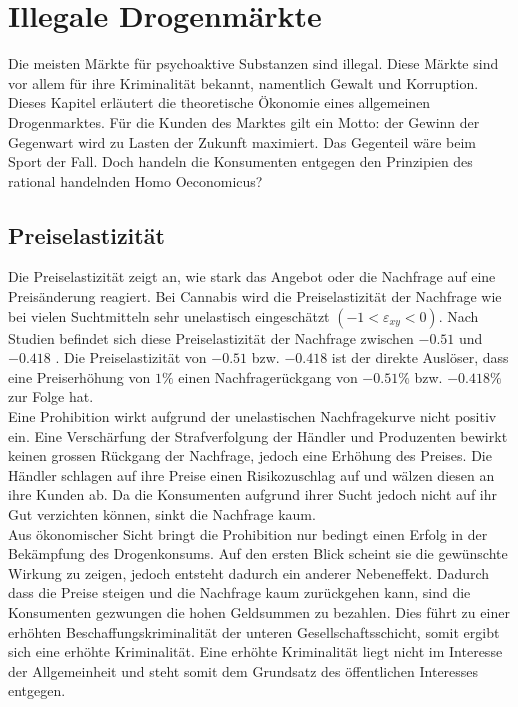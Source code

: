 \documentclass[../main.tex]{subfiles}
\begin{document}
 	\section{Illegale Drogenmärkte}
	 Die meisten Märkte für psychoaktive Substanzen sind illegal.
	 Diese Märkte sind vor allem für ihre Kriminalität bekannt, namentlich Gewalt und Korruption. 
	 Dieses Kapitel erläutert die theoretische Ökonomie eines allgemeinen Drogenmarktes.
	 Für die Kunden des Marktes gilt ein Motto: der Gewinn der Gegenwart wird zu Lasten der Zukunft maximiert. 
	 Das Gegenteil wäre beim Sport der Fall. 
	 Doch handeln die Konsumenten entgegen den Prinzipien des rational handelnden Homo Oeconomicus?

	\subsection{Preiselastizität}
	Die Preiselastizität zeigt an, wie stark das Angebot oder die Nachfrage auf eine Preisänderung reagiert.
	Bei Cannabis wird die Preiselastizität der Nachfrage wie bei vielen Suchtmitteln sehr unelastisch eingeschätzt $(-1<\varepsilon_{xy}<0)$. 
	Nach Studien befindet sich diese Preiselastizität der Nachfrage zwischen $-0.51$ \cite{golzar} und $-0.418$ \cite{halcoussis}.
	Die Preiselastizität von $-0.51$ bzw. $-0.418$ ist der direkte Auslöser, dass eine Preiserhöhung von $1\%$ einen Nachfragerückgang von $-0.51\%$ bzw. $-0.418\%$ zur Folge hat.\\
	
	\noindent
	Eine Prohibition wirkt aufgrund der unelastischen Nachfragekurve nicht positiv ein.
	Eine Verschärfung der Strafverfolgung der Händler und Produzenten bewirkt keinen grossen Rückgang der Nachfrage, jedoch eine Erhöhung des Preises.
	Die Händler schlagen auf ihre Preise einen Risikozuschlag auf und wälzen diesen an ihre Kunden ab.
	Da die Konsumenten aufgrund ihrer Sucht jedoch nicht auf ihr Gut verzichten können, sinkt die Nachfrage kaum.\\
	
	\noindent
	Aus ökonomischer Sicht bringt die Prohibition nur bedingt einen Erfolg in der Bekämpfung des Drogenkonsums. 
	Auf den ersten Blick scheint sie die gewünschte Wirkung zu zeigen, jedoch entsteht dadurch ein anderer Nebeneffekt. 
	Dadurch dass die Preise steigen und die Nachfrage kaum zurückgehen kann, sind die Konsumenten gezwungen die hohen Geldsummen zu bezahlen. 
	Dies führt zu einer erhöhten Beschaffungskriminalität der unteren Gesellschaftsschicht, somit ergibt sich eine erhöhte Kriminalität. 
	Eine erhöhte Kriminalität liegt nicht im Interesse der Allgemeinheit und steht somit dem Grundsatz des öffentlichen Interesses entgegen.
	
	
	 
	
\end{document}
